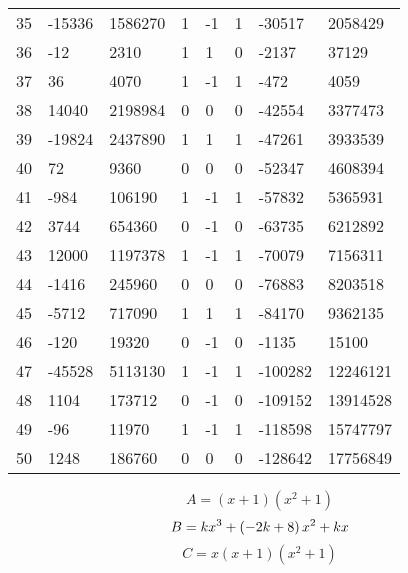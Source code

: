 \documentclass{amsart}
\begin{document}
\begin{longtable}{|l|l|l|lllll|}
35&-15336&1586270&1&-1&1&-30517&2058429\\
36&-12&2310&1&1&0&-2137&37129\\
37&36&4070&1&-1&1&-472&4059\\
38&14040&2198984&0&0&0&-42554&3377473\\
39&-19824&2437890&1&1&1&-47261&3933539\\
40&72&9360&0&0&0&-52347&4608394\\
41&-984&106190&1&-1&1&-57832&5365931\\
42&3744&654360&0&-1&0&-63735&6212892\\
43&12000&1197378&1&-1&1&-70079&7156311\\
44&-1416&245960&0&0&0&-76883&8203518\\
45&-5712&717090&1&1&1&-84170&9362135\\
46&-120&19320&0&-1&0&-1135&15100\\
47&-45528&5113130&1&-1&1&-100282&12246121\\
48&1104&173712&0&-1&0&-109152&13914528\\
49&-96&11970&1&-1&1&-118598&15747797\\
50&1248&186760&0&0&0&-128642&17756849\\
\hline
\end{longtable}
$$A=(x
 + 1)(x^2
 + 1)$$
$$B=k\*x^3
 + \left(-2\*k
 + 8\right) \*x^2
 + k\*x$$
$$C=x(x
 + 1)(x^2
 + 1)$$
\end{document}
